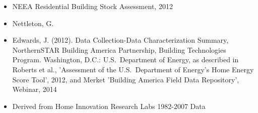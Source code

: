 \begin{itemize}
\item NEEA Residential Building Stock Assessment, 2012
\item Nettleton, G.
\item Edwards, J. (2012). Data Collection-Data Characterization Summary, NorthernSTAR Building America Partnership, Building Technologies Program. Washington, D.C.: U.S.~Department of Energy, as described in Roberts et al., 'Assessment of the U.S.~Department of Energy's Home Energy Score Tool', 2012, and Merket 'Building America Field Data Repository', Webinar, 2014
\item Derived from Home Innovation Research Labs 1982-2007 Data
\end{itemize}
